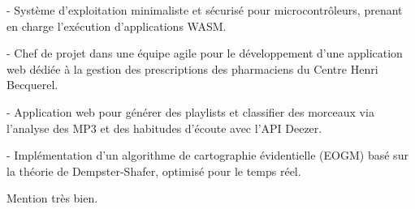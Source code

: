 \documentclass[10pt,a4paper,ragged2e,withhyper]{../AltaCV/altacv}
\begin{document}
\begin{paracol}{2}
  \divider


  \divider



  \begin{minipage}[t]{0.49\linewidth}
    {\small {} - Système d'exploitation minimaliste et sécurisé pour microcontrôleurs, prenant en charge l’exécution d’applications WASM.}

    \divider

    {\small {} - Chef de projet dans une équipe agile pour le développement d'une application web dédiée à la gestion des prescriptions des pharmaciens du Centre Henri Becquerel.}
  \end{minipage}
  \hfill
  \begin{minipage}[t]{0.49\linewidth}
    {\small {} - Application web pour générer des playlists et classifier des morceaux via l’analyse des MP3 et des habitudes d’écoute avec l’API Deezer.}

    \divider

    {\small {} - Implémentation d’un algorithme de cartographie évidentielle (EOGM) basé sur la théorie de Dempster-Shafer, optimisé pour le temps réel.}
  \end{minipage}

  \medskip

  \switchcolumn



  \divider

  Mention très bien.


\end{paracol}
\end{document}
